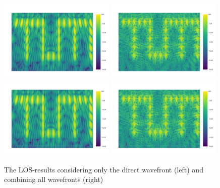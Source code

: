 \begin{figure}[ht]
    \centering
    \includegraphics[page=2, width=0.49\textwidth]{figures/multipath_los_direct.pdf}
    \includegraphics[page=2, width=0.49\textwidth]{figures/multipath_los_combined.pdf}
    \includegraphics[page=1, width=0.49\textwidth]{figures/multipath_los_direct.pdf}
    \includegraphics[page=1, width=0.49\textwidth]{figures/multipath_los_combined.pdf}
    \caption{The LOS-results considering only the direct wavefront (left) and combining all wavefronts (right)}\label{fig:MultipathLOS}
\end{figure}

